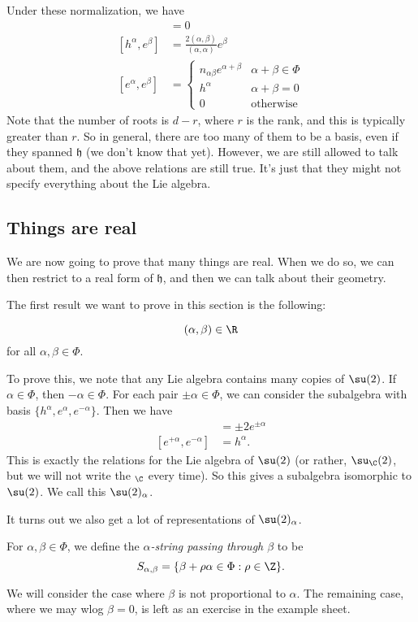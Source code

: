 \documentclass[a4paper]{article}
\begin{document}
Under these normalization, we have
\begin{align*}
  [h^\alpha, h^\beta] &= 0\\
  [h^\alpha, e^\beta] &= \frac{2(\alpha, \beta)}{(\alpha, \alpha)} e^\beta\\
  [e^\alpha, e^\beta] &=
  \begin{cases}
    n_{\alpha\beta} e^{\alpha + \beta} & \alpha + \beta \in \Phi\\
    h^\alpha & \alpha + \beta = 0\\
    0 & \text{otherwise}
  \end{cases}
\end{align*}
Note that the number of roots is $d - r$, where $r$ is the rank, and this is typically greater than $r$. So in general, there are too many of them to be a basis, even if they spanned $\mathfrak{h}$ (we don't know that yet). However, we are still allowed to talk about them, and the above relations are still true. It's just that they might not specify everything about the Lie algebra.

\subsection{Things are real}
We are now going to prove that many things are real. When we do so, we can then restrict to a real form of $\mathfrak{h}$, and then we can talk about their geometry.

The first result we want to prove in this section is the following:
\begin{thm}
  \[
    (\alpha, \beta) \in \R
  \]
  for all $\alpha, \beta \in \Phi$.
\end{thm}

To prove this, we note that any Lie algebra contains many copies of $\su(2)$. If $\alpha \in \Phi$, then $-\alpha \in \Phi$. For each pair $\pm \alpha \in \Phi$, we can consider the subalgebra with basis $\{h^\alpha, e^\alpha, e^{-\alpha}\}$. Then we have
\begin{align*}
  [h^\alpha, e^{\pm \alpha}] &= \pm 2 e^{\pm \alpha}\\
  [e^{+\alpha}, e^{-\alpha}] &= h^\alpha.
\end{align*}
This is exactly the relations for the Lie algebra of $\su(2)$ (or rather, $\su_\C(2)$, but we will not write the $_\C$ every time). So this gives a subalgebra isomorphic to $\su(2)$. We call this $\su(2)_\alpha$.

It turns out we also get a lot of representations of $\su(2)_\alpha$.
\begin{defi}[String]
  For $\alpha, \beta \in \Phi$, we define the \emph{$\alpha$-string passing through $\beta$} to be
  \[
    S_{\alpha, \beta} = \{\beta + \rho\alpha \in \Phi: \rho \in \Z\}.
  \]
\end{defi}
We will consider the case where $\beta$ is not proportional to $\alpha$. The remaining case, where we may wlog $\beta = 0$, is left as an exercise in the example sheet.
\end{document}
